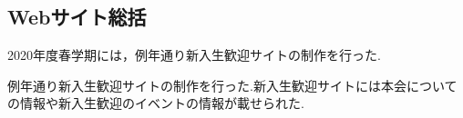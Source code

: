 \subsection*{Webサイト総括}


2020年度春学期には，例年通り新入生歓迎サイトの制作を行った.

例年通り新入生歓迎サイトの制作を行った.新入生歓迎サイトには本会についての情報や新入生歓迎のイベントの情報が載せられた.
